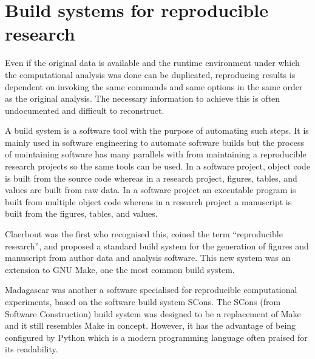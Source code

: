 \section{Build systems for reproducible research}

Even if the original data is available and the runtime environment under
which the computational analysis was done can be duplicated, reproducing results
is dependent on invoking the same commands and same
options in the same order as the original analysis.
The necessary information to achieve this is often undocumented
and difficult to reconstruct.

A build system is a software tool with the purpose of automating such
steps.  It is mainly used in software engineering to automate software
builds but the process of maintaining software has many parallels with
from maintaining a reproducible research projects so the same tools
can be used.  In a software project, object code is built from the
source code whereas in a research project, figures, tables, and values
are built from raw
data.  In a software project an executable program is built from multiple
object code whereas in a research project a manuscript is built from the
figures, tables, and values.

Claerbout \citep{ReDoc-claerbout} was the first who recognised this,
coined the term ``reproducible research'', and proposed a standard
build system for the generation of figures and manuscript from author
data and analysis software.  This new system was an extension to GNU
Make, one the most common build system.

Madagascar \citep{madagascar-scons} was another a software specialised
for reproducible computational experiments, based on the software
build system SCons.
The SCons (from Software Construction) build
system \citep{scons} was designed to be a
replacement of Make and it still resembles Make in concept.  However, it has
the advantage of being configured by Python which is a modern
programming language often praised for its readability.


